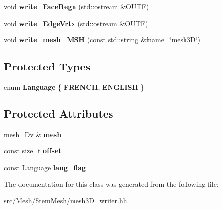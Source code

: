 \begin{DoxyCompactItemize}
void {\bfseries write\+\_\+\+Face\+Regn} (std\+::ostream \&O\+U\+TF)
\item 
\mbox{\label{classStemMesh3D_1_1mesh3Dv__writer__MSH_abe2c47741626aac00a659cac21f1fbc7}} 
void {\bfseries write\+\_\+\+Edge\+Vrtx} (std\+::ostream \&O\+U\+TF)
\item 
\mbox{\label{classStemMesh3D_1_1mesh3Dv__writer__MSH_afdf5e70b8a6edf803c2e45083ae3b489}} 
void {\bfseries write\+\_\+mesh\+\_\+\+M\+SH} (const std\+::string \&fname=\char`\"{}mesh3D\char`\"{})
\end{DoxyCompactItemize}
\subsection*{Protected Types}
\begin{DoxyCompactItemize}
\item 
\mbox{\label{classStemMesh3D_1_1mesh3Dv__writer__MSH_a7bcfd46c78fab12ebec84b739f8f2a6d}} 
enum {\bfseries Language} \{ {\bfseries F\+R\+E\+N\+CH}, 
{\bfseries E\+N\+G\+L\+I\+SH}
 \}
\end{DoxyCompactItemize}
\subsection*{Protected Attributes}
\begin{DoxyCompactItemize}
\item 
\mbox{\label{classStemMesh3D_1_1mesh3Dv__writer__MSH_ab86ffc519fc1287ee962f32339e5bf46}} 
\hyperlink{classStemMesh3D_1_1mesh__3Dv}{mesh\+\_\+Dv} \& {\bfseries mesh}
\item 
\mbox{\label{classStemMesh3D_1_1mesh3Dv__writer__MSH_a29f02c87b8e232aa8f6dac83ece95c7d}} 
const size\+\_\+t {\bfseries offset}
\item 
\mbox{\label{classStemMesh3D_1_1mesh3Dv__writer__MSH_aa5695d61e0cd3c4fb7da6f8779eef643}} 
const Language {\bfseries lang\+\_\+flag}
\end{DoxyCompactItemize}


The documentation for this class was generated from the following file\+:\begin{DoxyCompactItemize}
\item 
src/\+Mesh/\+Stem\+Mesh/mesh3\+D\+\_\+writer.\+hh\end{DoxyCompactItemize}
